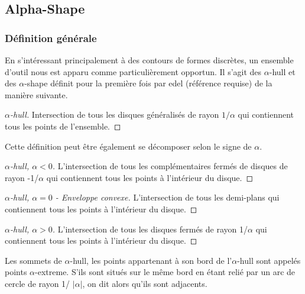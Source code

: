 \subsection{Alpha-Shape}

\subsubsection{Définition générale}

En s'intéressant principalement à des contours de formes discrètes, un ensemble d'outil nous est apparu comme particulièrement opportun. Il s'agit des $\alpha$-hull et des $\alpha$-shape définit pour la première fois par edel (référence requise) de la manière suivante.

\begin{proof}[$\alpha$-hull]
    Intersection de tous les disques généralisés de rayon $1/\alpha$ qui contiennent tous les points de l'ensemble.
\end{proof}

Cette définition peut être également se décomposer selon le signe de $\alpha$.

\begin{proof}[$\alpha$-hull, $\alpha < 0$]
    L'intersection de tous les complémentaires fermés de disques de rayon -1/$\alpha$ qui contiennent tous les points à l’intérieur du disque.
\end{proof}

\begin{proof}[$\alpha$-hull, $\alpha = 0$ - Enveloppe convexe]
      L'intersection de tous les demi-plans qui contiennent tous les points à l’intérieur du disque.
\end{proof}

\begin{proof}[$\alpha$-hull, $\alpha > 0$]
      L'intersection de tous les disques fermés de rayon 1/$\alpha$ qui contiennent tous les points à l’intérieur du disque.
\end{proof}


Les sommets de $\alpha$-hull, les points appartenant à son bord de l'$\alpha$-hull sont appelés points $\alpha$-extreme. S'ils sont situés sur le même bord en étant relié par un arc de cercle de rayon 1/ $\lvert \alpha \rvert$, on dit alors qu'ils sont adjacents.

